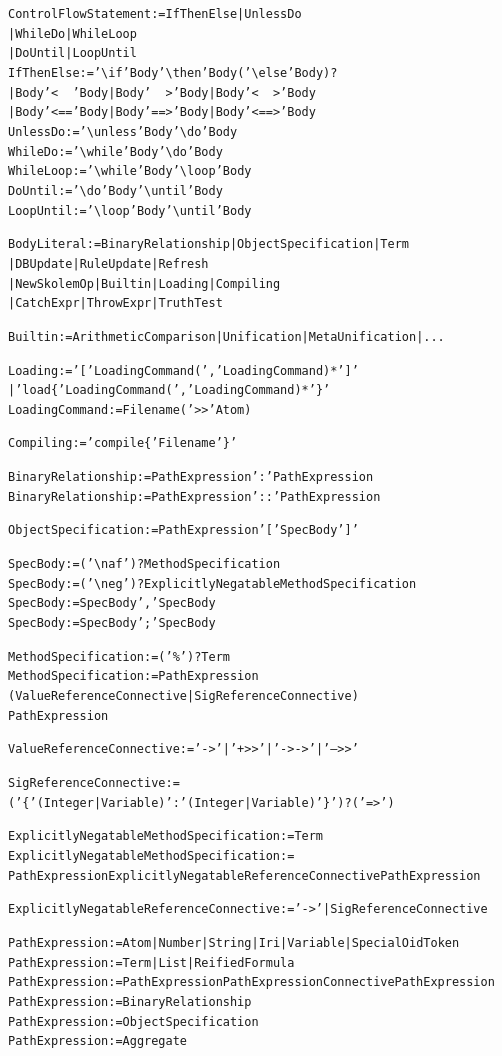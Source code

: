 \documentclass[11pt]{article}
\newcommand{\bs}{\textbackslash}
\newcommand{\RULELOGNAF}{{\texttt{{\bs}naf}}\xspace}
\newcommand{\RULELOGNEG}{{\texttt{{\bs}neg}}\xspace}
\begin{document}
{\begin{alltt}
ControlFlowStatement  := IfThenElse | UnlessDo
                          | WhileDo | WhileLoop
                          | DoUntil | LoopUntil
IfThenElse := '\bs{}if' Body '\bs{}then' Body  ('\bs{}else' Body)?
                | Body '<~~' Body | Body '~~>' Body | Body '<~~>' Body
                | Body '<==' Body | Body '==>' Body | Body '<==>' Body
UnlessDo   := '\bs{}unless' Body '\bs{}do' Body
WhileDo    := '\bs{}while' Body '\bs{}do' Body
WhileLoop  := '\bs{}while' Body '\bs{}loop' Body
DoUntil    := '\bs{}do' Body '\bs{}until' Body
LoopUntil  := '\bs{}loop' Body '\bs{}until' Body

BodyLiteral := BinaryRelationship | ObjectSpecification | Term
                | DBUpdate | RuleUpdate | Refresh
                | NewSkolemOp | Builtin | Loading | Compiling
                | CatchExpr | ThrowExpr | TruthTest

Builtin := ArithmeticComparison | Unification | MetaUnification | ...

Loading := '[' LoadingCommand (',' LoadingCommand)* ']'
           | 'load\{' LoadingCommand (',' LoadingCommand)* '\}'
LoadingCommand := Filename ('>>' Atom)

Compiling := 'compile\{' Filename '\}'

BinaryRelationship := PathExpression ':' PathExpression
BinaryRelationship := PathExpression '::' PathExpression

ObjectSpecification := PathExpression '[' SpecBody ']'

SpecBody := ('\RULELOGNAF')? MethodSpecification
SpecBody := ('\RULELOGNEG')? ExplicitlyNegatableMethodSpecification
SpecBody := SpecBody ',' SpecBody
SpecBody := SpecBody ';' SpecBody

MethodSpecification :=  ('\%')? Term
MethodSpecification :=  PathExpression
                        (ValueReferenceConnective | SigReferenceConnective)
                        PathExpression

ValueReferenceConnective :=  '->' | '+>>' | '->->' | '-->>'

SigReferenceConnective := ('\{' (Integer|Variable) ':' (Integer|Variable) '\}')? ('=>')

ExplicitlyNegatableMethodSpecification := Term
ExplicitlyNegatableMethodSpecification :=
            PathExpression ExplicitlyNegatableReferenceConnective PathExpression

ExplicitlyNegatableReferenceConnective := '->' | SigReferenceConnective

PathExpression := Atom | Number | String | Iri | Variable | SpecialOidToken
PathExpression := Term | List | ReifiedFormula
PathExpression := PathExpression  PathExpressionConnective PathExpression
PathExpression := BinaryRelationship
PathExpression := ObjectSpecification
PathExpression := Aggregate


\end{alltt}}
\end{document}
